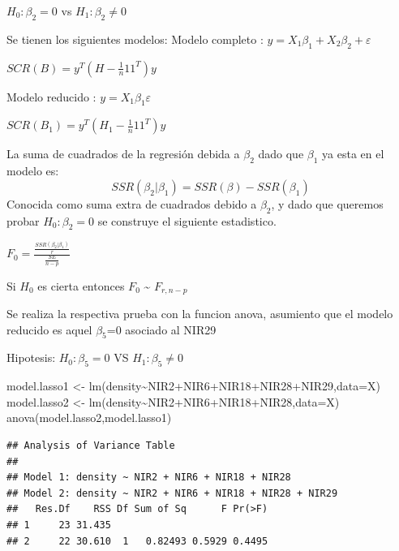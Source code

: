 \documentclass[
]{article}
\newenvironment{Shaded}{\begin{snugshade}}{\end{snugshade}}
\newcommand{\AttributeTok}[1]{\textcolor[rgb]{0.77,0.63,0.00}{#1}}
\newcommand{\FunctionTok}[1]{\textcolor[rgb]{0.00,0.00,0.00}{#1}}
\newcommand{\NormalTok}[1]{#1}
\newcommand{\OtherTok}[1]{\textcolor[rgb]{0.56,0.35,0.01}{#1}}
\newcommand{\SpecialCharTok}[1]{\textcolor[rgb]{0.00,0.00,0.00}{#1}}
\begin{document}
\begin{center}
$H_0 : \beta_2 =0$ vs $H_1: \beta_2 \neq 0 $
\end{center}

Se tienen los siguientes modelos: Modelo completo :
\(y = X_1\beta_1+X_2\beta_2+\varepsilon\)

\(SCR(B)= y^T(H-\frac{1}{n}11^T)y\)

Modelo reducido : \(y = X_1\beta_1\varepsilon\)

\(SCR(B_1)= y^T(H_1-\frac{1}{n}11^T)y\)

La suma de cuadrados de la regresión debida a \(\beta_2\) dado que
\(\beta_1\) ya esta en el modelo es:
\[SSR(\beta_2|\beta_1)=SSR(\beta)-SSR(\beta_1)\] Conocida como suma
extra de cuadrados debido a \(\beta_2\), y dado que queremos probar
\(H_0 : \beta_2 =0\) se construye el siguiente estadistico.

\(F_0 = \frac{\frac{SSR(\beta_2|\beta_1)}{r}}{\frac{SE}{n-p}}\)

Si \(H_0\) es cierta entonces \(F_0\) \textasciitilde{} \(F_{r,n-p}\)

Se realiza la respectiva prueba con la funcion anova, asumiento que el
modelo reducido es aquel \(\beta_5\)=0 asociado al NIR29

Hipotesis: \(H_0:\beta_5=0\) VS \(H_1:\beta_5\neq0\)

\begin{Shaded}
\begin{Highlighting}[]
\NormalTok{model.lasso1 }\OtherTok{\textless{}{-}} \FunctionTok{lm}\NormalTok{(density}\SpecialCharTok{\textasciitilde{}}\NormalTok{NIR2}\SpecialCharTok{+}\NormalTok{NIR6}\SpecialCharTok{+}\NormalTok{NIR18}\SpecialCharTok{+}\NormalTok{NIR28}\SpecialCharTok{+}\NormalTok{NIR29,}\AttributeTok{data=}\NormalTok{X)}
\NormalTok{model.lasso2 }\OtherTok{\textless{}{-}} \FunctionTok{lm}\NormalTok{(density}\SpecialCharTok{\textasciitilde{}}\NormalTok{NIR2}\SpecialCharTok{+}\NormalTok{NIR6}\SpecialCharTok{+}\NormalTok{NIR18}\SpecialCharTok{+}\NormalTok{NIR28,}\AttributeTok{data=}\NormalTok{X)}
\FunctionTok{anova}\NormalTok{(model.lasso2,model.lasso1)}
\end{Highlighting}
\end{Shaded}

\begin{verbatim}
## Analysis of Variance Table
## 
## Model 1: density ~ NIR2 + NIR6 + NIR18 + NIR28
## Model 2: density ~ NIR2 + NIR6 + NIR18 + NIR28 + NIR29
##   Res.Df    RSS Df Sum of Sq      F Pr(>F)
## 1     23 31.435                           
## 2     22 30.610  1   0.82493 0.5929 0.4495
\end{verbatim}
\end{document}
